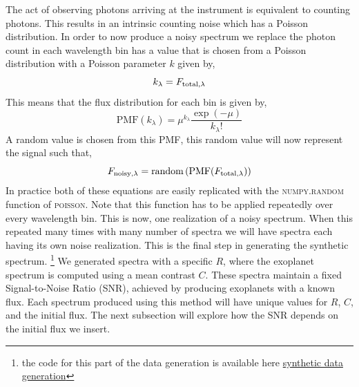 The act of observing photons arriving at the instrument is equivalent to counting photons.
This results in an intrinsic counting noise which has a Poisson distribution.
In order to now produce a noisy spectrum we replace the photon count in each wavelength bin has a value that is chosen from a Poisson distribution with a Poisson parameter $k$ given by,
 \begin{equation}
     k_\lambda = F_{\rm{total},\lambda}
     \label{eq:noise}
 \end{equation}
This means that the flux distribution for each bin is given by,
 \begin{equation}
    \textrm{PMF}(k_\lambda) = \mu^{k_\lambda}\dfrac{\exp(-\mu)}{k_\lambda!} 
    \label{eq: poisson}
 \end{equation}
A random value is chosen from this PMF, this random value will now represent the signal such that,
 \begin{equation}
     F_{\rm{noisy,\lambda}} = \textrm{random}\left(\textrm{PMF}(F_{\rm{total,\lambda}})\right)
 \end{equation}
In practice both of these equations are easily replicated with the \textsc{numpy.random} function of \textsc{poisson}.
Note that this function has to be applied repeatedly over every wavelength bin.
This is now, one realization of a noisy spectrum.
When this repeated many times with many number of spectra we will have spectra each having its own noise realization. 
This is the final step in generating the synthetic spectrum. \footnote{the code for this part of the data generation is available here \href{https://github.com/digirak/PhD/blob/master/CCF_code/CCFcore/SyntheticData.py}{synthetic data generation}}
We generated spectra with a specific $R$, where the exoplanet spectrum is computed using a mean contrast $C$. These spectra maintain a fixed Signal-to-Noise Ratio (SNR), achieved by producing exoplanets with a known flux. Each spectrum produced using this method will have unique values for $R$, $C$, and the initial flux. The next subsection will explore how the SNR depends on the initial flux we insert.

